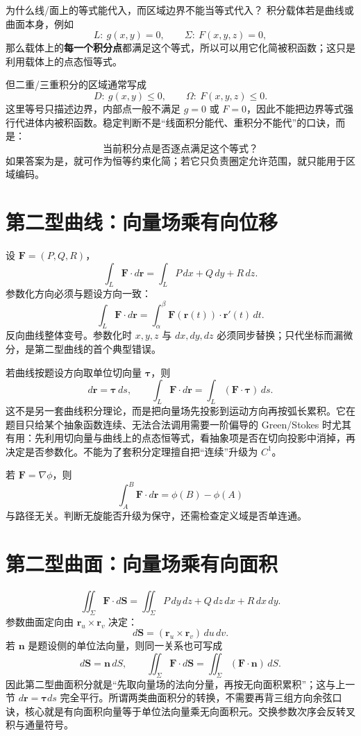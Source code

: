 \documentclass[11pt,a4paper,fontset=fandol]{ctexart}
\begin{document}
\begin{corebox}{为什么线/面上的等式能代入，而区域边界不能当等式代入？}
积分载体若是曲线或曲面本身，例如
\[
L:\ g(x,y)=0,
\qquad
\Sigma:\ F(x,y,z)=0,
\]
那么载体上的\textbf{每一个积分点}都满足这个等式，所以可以用它化简被积函数；这只是利用载体上的点态恒等式。

但二重/三重积分的区域通常写成
\[
D:\ g(x,y)\le0,
\qquad
\Omega:\ F(x,y,z)\le0.
\]
这里等号只描述边界，内部点一般不满足 $g=0$ 或 $F=0$，因此不能把边界等式强行代进体内被积函数。稳定判断不是“线面积分能代、重积分不能代”的口诀，而是：
\[
\boxed{\text{当前积分点是否逐点满足这个等式？}}
\]
如果答案为是，就可作为恒等约束化简；若它只负责圈定允许范围，就只能用于区域编码。
\end{corebox}

\section{第二型曲线：向量场乘有向位移}

设 $\mathbf F=(P,Q,R)$，
\[
\boxed{\int_L\mathbf F\cdot d\mathbf r
=\int_L P\,dx+Q\,dy+R\,dz.}
\]
参数化方向必须与题设方向一致：
\[
\int_L\mathbf F\cdot d\mathbf r
=\int_\alpha^\beta\mathbf F(\mathbf r(t))\cdot\mathbf r'(t)\,dt.
\]
反向曲线整体变号。参数化时 $x,y,z$ 与 $dx,dy,dz$ 必须同步替换；只代坐标而漏微分，是第二型曲线的首个典型错误。

若曲线按题设方向取单位切向量 $\boldsymbol\tau$，则
\[
d\mathbf r=\boldsymbol\tau\,ds,
\qquad
\boxed{\int_L\mathbf F\cdot d\mathbf r
=\int_L(\mathbf F\cdot\boldsymbol\tau)\,ds.}
\]
这不是另一套曲线积分理论，而是把向量场先投影到运动方向再按弧长累积。它在题目只给某个抽象函数连续、无法合法调用需要一阶偏导的 Green/Stokes 时尤其有用：先利用切向量与曲线上的点态恒等式，看抽象项是否在切向投影中消掉，再决定是否参数化。不能为了套积分定理擅自把“连续”升级为 $C^1$。

若 $\mathbf F=\nabla\phi$，则
\[
\boxed{\int_A^B\mathbf F\cdot d\mathbf r=\phi(B)-\phi(A)}
\]
与路径无关。判断无旋能否升级为保守，还需检查定义域是否单连通。

\section{第二型曲面：向量场乘有向面积}

\[
\boxed{\iint_\Sigma\mathbf F\cdot d\mathbf S
=\iint_\Sigma P\,dy\,dz+Q\,dz\,dx+R\,dx\,dy.}
\]
参数曲面定向由 $\mathbf r_u\times\mathbf r_v$ 决定：
\[
d\mathbf S=(\mathbf r_u\times\mathbf r_v)\,du\,dv.
\]
若 $\mathbf n$ 是题设侧的单位法向量，则同一关系也可写成
\[
\boxed{d\mathbf S=\mathbf n\,dS,
\qquad
\iint_\Sigma\mathbf F\cdot d\mathbf S
=\iint_\Sigma(\mathbf F\cdot\mathbf n)\,dS.}
\]
因此第二型曲面积分就是“先取向量场的法向分量，再按无向面积累积”；这与上一节 $d\mathbf r=\boldsymbol\tau ds$ 完全平行。所谓两类曲面积分的转换，不需要再背三组方向余弦口诀，核心就是有向面积向量等于单位法向量乘无向面积元。交换参数次序会反转叉积与通量符号。
\end{document}
